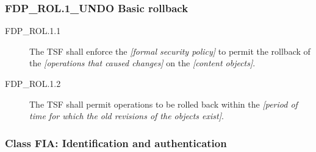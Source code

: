 \documentclass[10pt,a4paper,english]{article}
\begin{document}

\hypertarget{fdp-rol-1-undo-basic-rollback}{}
\subsubsection*{FDP{\_}ROL.1{\_}UNDO Basic rollback}
\begin{description}
\item[FDP{\_}ROL.1.1 ]

The TSF shall enforce the \emph{{[}formal security policy]} to permit
the rollback of the \emph{{[}operations that caused changes]} on the \emph{{[}content
objects]}.

\item[FDP{\_}ROL.1.2 ]

The TSF shall permit operations to be rolled back
within the \emph{{[}period of time for which the old revisions of the objects
exist]}.

\end{description}



\hypertarget{class-fia-identification-and-authentication}{}
\subsubsection*{Class FIA: Identification and authentication}



\hypertarget{fia-afl-z-1-authentication-failure-handling}{}
\end{document}
